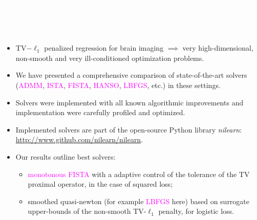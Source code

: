 \documentclass[french]{STIC_poster}
\begin{document}
\begin{frame}[t]
\begin{columns}[t]
\begin{column}{.48\linewidth}
\begin{abox}{\textbf{\textcolor{white}{Results}}}
			  \end{abox}
			\end{column}
			\hfill
		\end{columns}

                
\begin{abox}{\textbf{\textcolor{white}{Conclusion}}}
\begin{itemize}
\item TV$-\ell_{1}$ penalized regression for brain imaging $\implies$ very high-dimensional, non-smooth and very ill-conditioned optimization
problems.
\item We have presented a comprehensive comparison of state-of-the-art
solvers (\textcolor{magenta}{ADMM}, \textcolor{magenta}{ISTA}, \textcolor{magenta}{FISTA}, \textcolor{magenta}{HANSO}, \textcolor{magenta}{LBFGS}, etc.) in these settings.
\item Solvers were implemented with all known
algorithmic improvements and implementation were carefully profiled and
optimized.
\item Implemented solvers are part of the open-source Python library \textit{nilearn}: \url{http://www.github.com/nilearn/nilearn}.
\item Our results outline best solvers:
  \footnotesize
  \begin{itemize}
  \item \textcolor{magenta}{monotonous FISTA} with
    a adaptive control of the tolerance of the TV proximal operator, in the case of squared loss;
  \item smoothed quasi-newton (for example \textcolor{magenta}{LBFGS} here) based on surrogate upper-bounds of the non-smooth TV-$\ell_{1}$ penalty, for logistic loss.
  \end{itemize}
\end{itemize}
\end{abox}


\end{frame}
\end{document}
